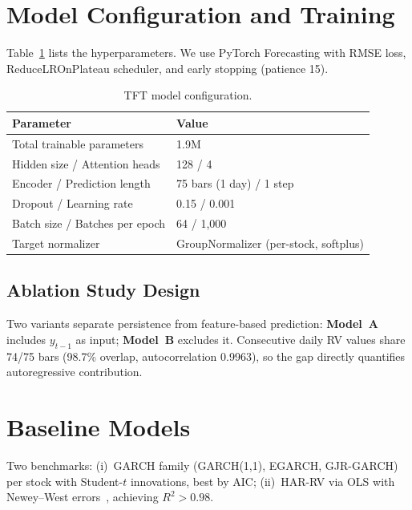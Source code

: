 \documentclass[runningheads]{llncs}
\begin{document}
\section{Model Configuration and Training}\label{sec:model}

Table~\ref{tab:config} lists the hyperparameters. We use PyTorch Forecasting with RMSE loss, ReduceLROnPlateau scheduler, and early stopping (patience 15).

\begin{table}[!htbp]
\caption{TFT model configuration.}\label{tab:config}
\centering
\begin{tabular}{ll}
\toprule
\textbf{Parameter} & \textbf{Value}\\
\midrule
Total trainable parameters & 1.9M\\
Hidden size / Attention heads & 128 / 4\\
Encoder / Prediction length & 75 bars (1 day) / 1 step\\
Dropout / Learning rate & 0.15 / 0.001\\
Batch size / Batches per epoch & 64 / 1{,}000\\
Target normalizer & GroupNormalizer (per-stock, softplus)\\
\bottomrule
\end{tabular}
\end{table}

\subsection{Ablation Study Design}
Two variants separate persistence from feature-based prediction: \textbf{Model~A} includes $y_{t-1}$ as input; \textbf{Model~B} excludes it. Consecutive daily RV values share 74/75 bars (98.7\% overlap, autocorrelation 0.9963), so the gap directly quantifies autoregressive contribution.

\section{Baseline Models}\label{sec:baselines}

Two benchmarks: (i)~GARCH family (GARCH(1,1), EGARCH, GJR-GARCH) per stock with Student-$t$ innovations, best by AIC; (ii)~HAR-RV via OLS with Newey--West errors~\cite{corsi2009}, achieving $R^2 > 0.98$.
\end{document}
